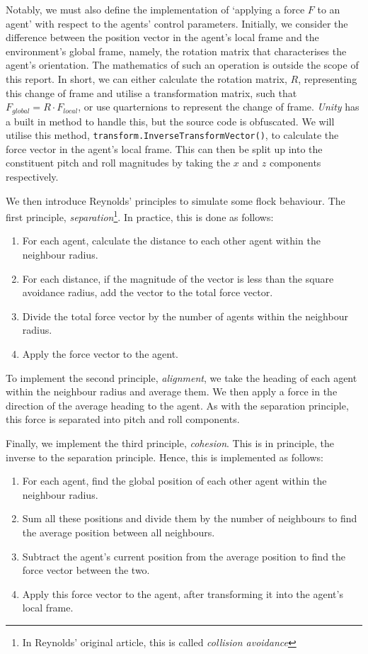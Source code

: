 \documentclass{article}
\begin{document}
Notably, we must also define the implementation of `applying a force $F$ to an agent' with respect to the agents' control parameters. Initially, we consider the difference between the position vector in the agent's local frame and the environment's global frame, namely, the rotation matrix that characterises the agent's orientation. The mathematics of such an operation is outside the scope of this report. In short, we can either calculate the rotation matrix, $R$, representing this change of frame and utilise a transformation matrix, such that $F_{global} = R \cdot F_{local}$, or use quarternions to represent the change of frame. \emph{Unity} has a built in method to handle this, but the source code is obfuscated. We will utilise this method, \verb|transform.InverseTransformVector()|, to calculate the force vector in the agent's local frame. This can then be split up into the constituent pitch and roll magnitudes by taking the $x$ and $z$ components respectively.

We then introduce Reynolds' principles \cite{Reynolds} to simulate some flock behaviour. The first principle, \emph{separation}\footnote{In Reynolds' original article, this is called \emph{collision avoidance}}. In practice, this is done as follows:

\begin{enumerate}
    \item For each agent, calculate the distance to each other agent within the neighbour radius.
    \item For each distance, if the magnitude of the vector is less than the square avoidance radius, add the vector to the total force vector.
    \item Divide the total force vector by the number of agents within the neighbour radius.
    \item Apply the force vector to the agent.
\end{enumerate}

To implement the second principle, \emph{alignment}, we take the heading of each agent within the neighbour radius and average them. We then apply a force in the direction of the average heading to the agent. As with the separation principle, this force is separated into pitch and roll components.

Finally, we implement the third principle, \emph{cohesion}. This is in principle, the inverse to the separation principle. Hence, this is implemented as follows:

\begin{enumerate}
    \item For each agent, find the global position of each other agent within the neighbour radius.
    \item Sum all these positions and divide them by the number of neighbours to find the average position between all neighbours.
    \item Subtract the agent's current position from the average position to find the force vector between the two.
    \item Apply this force vector to the agent, after transforming it into the agent's local frame.
\end{enumerate}
\end{document}
